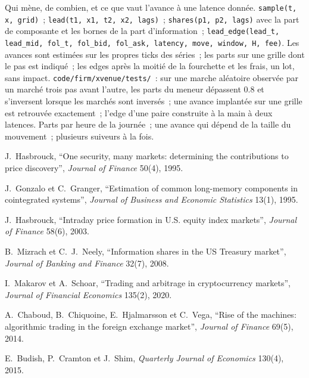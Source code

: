 \begin{build}
 Qui mène, de combien, et ce que vaut l'avance à une latence donnée.
 \texttt{sample(t, x, grid)}~; \texttt{lead(t1, x1, t2, x2, lags)}~; \texttt{shares(p1, p2, lags)} avec la part de composante et les
bornes de la part d'information~; \texttt{lead\_edge(lead\_t, lead\_mid, fol\_t, fol\_bid, fol\_ask, latency, move, window, H, fee)}.
 Les avances sont estimées sur les propres ticks des séries~; les parts sur une grille dont le pas est indiqué~; les edges après la moitié de la fourchette et les frais, un lot,
sans impact.
 \texttt{code/firm/xvenue/tests/}~: sur une marche aléatoire observée par un marché trois pas avant l'autre, les parts du meneur
dépassent 0.8 et s'inversent lorsque les marchés sont inversés~; une avance implantée sur une grille est retrouvée exactement~; l'edge d'une paire construite à la main à deux latences.
 Parts par heure de la journée~; une avance qui dépend de la taille du mouvement~; plusieurs suiveurs à la fois.
\end{build}

\begin{omsources}
\item J.~Hasbrouck, ``One security, many markets: determining the contributions to price discovery'', \emph{Journal of Finance} 50(4), 1995.
\item J.~Gonzalo et C.~Granger, ``Estimation of common long-memory components in cointegrated systems'', \emph{Journal of Business and Economic
Statistics} 13(1), 1995.
\item J.~Hasbrouck, ``Intraday price formation in U.S. equity index markets'', \emph{Journal of Finance} 58(6), 2003.
\item B.~Mizrach et C.~J.~Neely, ``Information shares in the US Treasury market'', \emph{Journal of Banking and Finance} 32(7), 2008.
\item I.~Makarov et A.~Schoar, ``Trading and arbitrage in cryptocurrency markets'', \emph{Journal of Financial Economics} 135(2), 2020.
\item A.~Chaboud, B.~Chiquoine, E.~Hjalmarsson et C.~Vega, ``Rise of the machines: algorithmic trading in the foreign exchange market'',
\emph{Journal of Finance} 69(5), 2014.
\item E.~Budish, P.~Cramton et J.~Shim, \emph{Quarterly Journal of Economics} 130(4), 2015.
\end{omsources}

